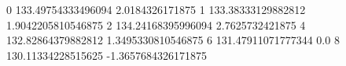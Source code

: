 0 133.49754333496094 2.0184326171875
1 133.38333129882812 1.9042205810546875
2 134.24168395996094 2.7625732421875
4 132.82864379882812 1.3495330810546875
6 131.47911071777344 0.0
8 130.11334228515625 -1.3657684326171875

